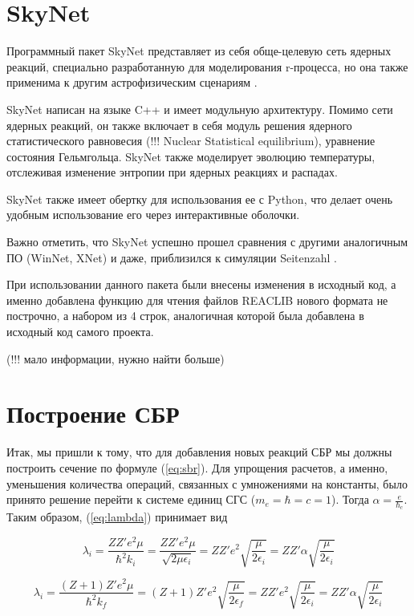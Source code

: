 \documentclass[%
master,    %
natbib,      %
subf,        %
href,        %
colorlinks,  %
]{disser}
\begin{document}
\section{SkyNet}

Программный пакет SkyNet представляет из себя обще-целевую сеть ядерных реакций, специально разработанную для моделирования r-процесса, но она также применима к другим астрофизическим сценариям \cite{skynet}.

SkyNet написан на языке C++ и имеет модульную архитектуру. Помимо сети ядерных реакций, он также включает в себя модуль решения ядерного статистического равновесия (!!! Nuclear Statistical equilibrium), уравнение состояния Гельмгольца. SkyNet также моделирует эволюцию температуры, отслеживая изменение энтропии при ядерных реакциях и распадах.

SkyNet также имеет обертку для использования ее с Python, что делает очень удобным использование его через интерактивные оболочки.

Важно отметить, что SkyNet успешно прошел сравнения с другими аналогичным ПО (WinNet, XNet) и даже, приблизился к симуляции Seitenzahl \cite{simulation}.

При использовании данного пакета были внесены изменения в исходный код, а именно добавлена функцию для чтения файлов REACLIB нового формата не построчно, а набором из 4 строк, аналогичная которой была добавлена в исходный код самого проекта.

(!!! мало информации, нужно найти больше)

\section{Построение СБР}

Итак, мы пришли к тому, что для добавления новых реакций СБР мы должны построить сечение по формуле (\ref{eq:sbr}). Для упрощения расчетов, а именно, уменьшения количества операций, связанных с умножениями на константы, было принято решение перейти к системе единиц СГС ($m_e = \hbar = c = 1$). Тогда $\alpha = \frac{e}{\hbar_c}$. Таким образом, (\ref{eq:lambda}) принимает вид

\begin{equation}
\lambda_i = \frac{Z Z' e^2 \mu}{\hbar^2 k_i} = \frac{Z Z' e^2 \mu}{\sqrt{2\mu \epsilon_i}} = Z Z' e^2 \sqrt{\frac{\mu}{2 \epsilon_i}} = Z Z' \alpha \sqrt{\frac{\mu}{2 \epsilon_i}}
\end{equation}

\begin{equation}
\lambda_i = \frac{(Z+1) Z'  e^2 \mu}{\hbar^2 k_f} = (Z + 1)Z' e^2 \sqrt{\frac{\mu}{2 \epsilon_f}} = Z Z' e^2 \sqrt{\frac{\mu}{2 \epsilon_i}} = Z Z' \alpha \sqrt{\frac{\mu}{2 \epsilon_i}}
\end{equation}
\end{document}
